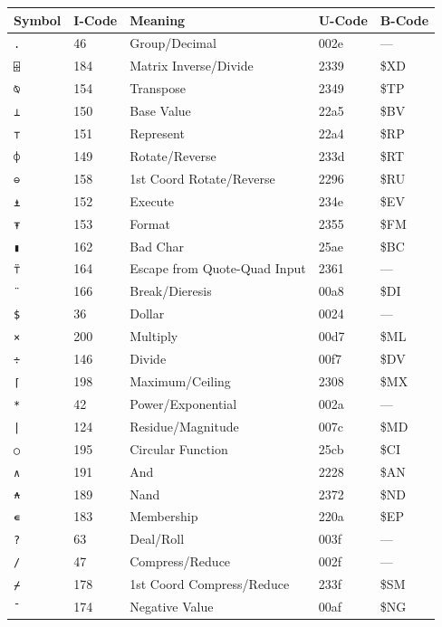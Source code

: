 \documentclass[a4paper,twoside,11pt]{article}
\begin{document}
\begin{table}
\centering
\begin{tabular}{||l|l|l|l|l||}
\hline\hline
Symbol&I-Code&Meaning&U-Code&B-Code\\
\hline
\texttt{.} & 46 & Group/Decimal & 002e & ---\\\hline
\texttt{⌹} & 184 & Matrix Inverse/Divide & 2339 & \$XD\\\hline
\texttt{⍉} & 154 & Transpose & 2349 & \$TP\\\hline
\texttt{⊥} & 150 & Base Value & 22a5 & \$BV\\\hline
\texttt{⊤} & 151 & Represent & 22a4 & \$RP\\\hline
\texttt{⌽} & 149 & Rotate/Reverse & 233d & \$RT\\\hline
\texttt{⊖} & 158 & 1st Coord Rotate/Reverse & 2296 & \$RU\\\hline
\texttt{⍎} & 152 & Execute & 234e & \$EV\\\hline
\texttt{⍕} & 153 & Format & 2355 & \$FM\\\hline
\texttt{▮} & 162 & Bad Char & 25ae & \$BC\\\hline
\texttt{⍡} & 164 & Escape from Quote-Quad Input & 2361 & ---\\\hline
\texttt{¨} & 166 & Break/Dieresis & 00a8 & \$DI\\\hline
\texttt{\$} & 36 & Dollar & 0024 & ---\\\hline
\texttt{×} & 200 & Multiply & 00d7 & \$ML\\\hline
\texttt{÷} & 146 & Divide & 00f7 & \$DV\\\hline
\texttt{⌈} & 198 & Maximum/Ceiling & 2308 & \$MX\\\hline
\texttt{*} & 42 & Power/Exponential & 002a & ---\\\hline
\texttt{|} & 124 & Residue/Magnitude & 007c & \$MD\\\hline
\texttt{○} & 195 & Circular Function & 25cb & \$CI\\\hline
\texttt{∧} & 191 & And & 2228 & \$AN\\\hline
\texttt{⍲} & 189 & Nand & 2372 & \$ND\\\hline
\texttt{∊} & 183 & Membership & 220a & \$EP\\\hline
\texttt{?} & 63 & Deal/Roll & 003f & ---\\\hline
\texttt{/} & 47 & Compress/Reduce & 002f & ---\\\hline
\texttt{⌿} & 178 & 1st Coord Compress/Reduce & 233f & \$SM\\\hline
\texttt{¯} & 174 & Negative Value & 00af & \$NG\\\hline

\end{tabular}
\end{table}
\end{document}
